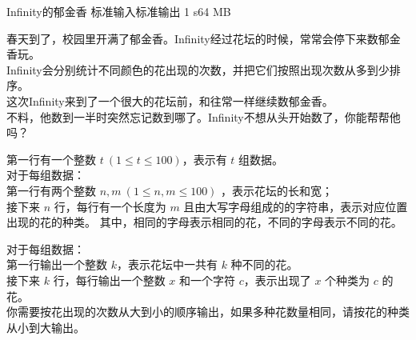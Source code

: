\gdef\thisproblemauthor{Infinity}
\begin{problem}{Infinity的郁金香}
{标准输入}{标准输出}
{1 s}{64 MB}{}

春天到了，校园里开满了郁金香。Infinity经过花坛的时候，常常会停下来数郁金香玩。\\
Infinity会分别统计不同颜色的花出现的次数，并把它们按照出现次数从多到少排序。\\
这次Infinity来到了一个很大的花坛前，和往常一样继续数郁金香。\\
不料，他数到一半时突然忘记数到哪了。Infinity不想从头开始数了，你能帮帮他吗？

\InputFile

第一行有一个整数 $t\ (1 \le t \le 100)$，表示有 $t$ 组数据。\\
对于每组数据：\\
第一行有两个整数 $n,m\ (1\le n,m\le 100)$ ，表示花坛的长和宽；\\
接下来 $n$ 行，每行有一个长度为 $m$ 且由大写字母组成的的字符串，表示对应位置出现的花的种类。
其中，相同的字母表示相同的花，不同的字母表示不同的花。

\OutputFile

对于每组数据：\\
第一行输出一个整数 $k$，表示花坛中一共有 $k$ 种不同的花。\\
接下来 $k$ 行，每行输出一个整数 $x$ 和一个字符 $c$，表示出现了 $x$ 个种类为 $c$ 的花。\\
你需要按花出现的次数从大到小的顺序输出，如果多种花数量相同，请按花的种类从小到大输出。

\Example

\begin{example}
%
\end{example}

\end{problem}
